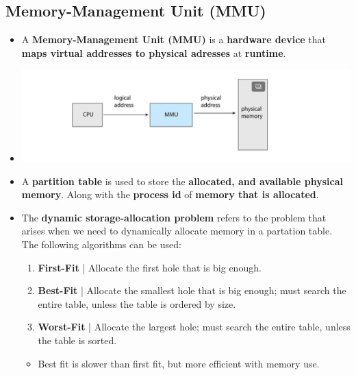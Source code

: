 \documentclass{article}
\begin{document}
    \subsection*{Memory-Management Unit (MMU)}
    \begin{itemize}
        \item A \textbf{Memory-Management Unit (MMU)} is a \textbf{hardware device} that \textbf{maps virtual addresses to physical adresses} at \textbf{runtime}.
        \item[] \includegraphics*[width=\textwidth - 25pt]{images/Memory-Managment-Unit.PNG}
        \item A \textbf{partition table} is used to store the \textbf{allocated, and available physical memory}. Along with the \textbf{process id} of \textbf{memory that is allocated}.
        \item The \textbf{dynamic storage-allocation problem} refers to the problem that arises when we need to dynamically allocate memory in a partation table. The following algorithms can be used:
        \begin{enumerate}
            \item \textbf{First-Fit} | Allocate the first hole that is big enough.
            \item \textbf{Best-Fit} | Allocate the smallest hole that is big enough; must search the entire table, unless the table is ordered by size.
            \item \textbf{Worst-Fit} | Allocate the largest hole; must search the entire table, unless the table is sorted.
        \end{enumerate}
        \begin{itemize}
            \item Best fit is slower than first fit, but more efficient with memory use.
        \end{itemize}
    \end{itemize}
\end{document}
